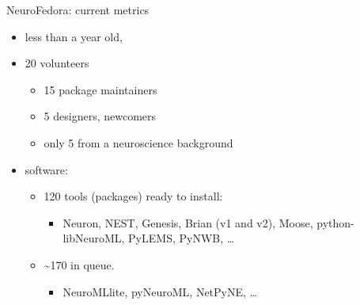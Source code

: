 \begin{frame}[c]{NeuroFedora: current metrics}
  \begin{itemize}
    \item \alert{less than a year old\footnotemark[8],}
      \pause{}
    \item \textcolor{FirstGreen}{20 volunteers}
      \begin{itemize}
        \item 15 package maintainers
        \item 5 designers, newcomers
        \item only 5 from a neuroscience background
      \end{itemize}
      \pause{}
    \item \textcolor{FriendsMagenta}{software:}
      \begin{itemize}
        \item 120 tools (packages) ready to install\footnotemark[9]:
          \begin{itemize}
            \item Neuron, NEST, Genesis, Brian (v1 and v2), Moose, python-libNeuroML, PyLEMS, PyNWB, \ldots
          \end{itemize}
        \item \textasciitilde{}170 in queue\footnotemark[10].
          \begin{itemize}
            \item NeuroMLlite, pyNeuroML, NetPyNE, \ldots
          \end{itemize}
      \end{itemize}
  \end{itemize}
\end{frame}
